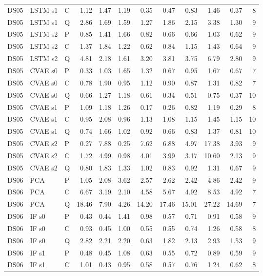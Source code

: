 \documentclass[10pt]{article}
\begin{document}
{\begin{longtable}{lllrrrrrrrrr}
DS05 & LSTM s1 & C & 1.12 & 1.47 & 1.19 & 0.35 & 0.47 & 0.83 & 1.46 & 0.37 & 8 \\
DS05 & LSTM s1 & Q & 2.86 & 1.69 & 1.59 & 1.27 & 1.86 & 2.15 & 3.38 & 1.30 & 9 \\
DS05 & LSTM s2 & P & 0.85 & 1.41 & 1.66 & 0.82 & 0.66 & 0.66 & 1.03 & 0.62 & 9 \\
DS05 & LSTM s2 & C & 1.37 & 1.84 & 1.22 & 0.62 & 0.84 & 1.15 & 1.43 & 0.64 & 9 \\
DS05 & LSTM s2 & Q & 4.81 & 2.18 & 1.61 & 3.20 & 3.81 & 3.75 & 6.79 & 2.80 & 9 \\
DS05 & CVAE s0 & P & 0.33 & 1.03 & 1.65 & 1.32 & 0.67 & 0.95 & 1.67 & 0.67 & 7 \\
DS05 & CVAE s0 & C & 0.78 & 1.90 & 0.95 & 1.12 & 0.90 & 0.87 & 1.31 & 0.82 & 7 \\
DS05 & CVAE s0 & Q & 0.66 & 1.27 & 1.18 & 0.61 & 0.34 & 0.51 & 0.75 & 0.37 & 10 \\
DS05 & CVAE s1 & P & 1.09 & 1.18 & 1.26 & 0.17 & 0.26 & 0.82 & 1.19 & 0.29 & 8 \\
DS05 & CVAE s1 & C & 0.95 & 2.08 & 0.96 & 1.13 & 1.08 & 1.15 & 1.45 & 1.15 & 10 \\
DS05 & CVAE s1 & Q & 0.74 & 1.66 & 1.02 & 0.92 & 0.66 & 0.83 & 1.37 & 0.81 & 10 \\
DS05 & CVAE s2 & P & 0.27 & 7.88 & 0.25 & 7.62 & 6.88 & 4.97 & 17.38 & 3.93 & 9 \\
DS05 & CVAE s2 & C & 1.72 & 4.99 & 0.98 & 4.01 & 3.99 & 3.17 & 10.60 & 2.13 & 9 \\
DS05 & CVAE s2 & Q & 0.80 & 1.83 & 1.33 & 1.02 & 0.83 & 0.92 & 1.31 & 0.67 & 9 \\
\midrule
DS06 & PCA & P & 1.05 & 2.08 & 3.62 & 2.57 & 2.62 & 2.42 & 4.86 & 2.42 & 9 \\
DS06 & PCA & C & 6.67 & 3.19 & 2.10 & 4.58 & 5.67 & 4.92 & 8.53 & 4.92 & 7 \\
DS06 & PCA & Q & 18.46 & 7.90 & 4.26 & 14.20 & 17.46 & 15.01 & 27.22 & 14.69 & 7 \\
DS06 & IF s0 & P & 0.43 & 0.44 & 1.41 & 0.98 & 0.57 & 0.71 & 0.91 & 0.58 & 9 \\
DS06 & IF s0 & C & 0.93 & 0.45 & 1.00 & 0.55 & 0.55 & 0.74 & 1.26 & 0.58 & 8 \\
DS06 & IF s0 & Q & 2.82 & 2.21 & 2.20 & 0.63 & 1.82 & 2.13 & 2.93 & 1.53 & 9 \\
DS06 & IF s1 & P & 0.48 & 0.45 & 1.08 & 0.63 & 0.55 & 0.72 & 0.89 & 0.59 & 9 \\
DS06 & IF s1 & C & 1.01 & 0.43 & 0.95 & 0.58 & 0.57 & 0.76 & 1.24 & 0.62 & 8 \\

\end{longtable}}
\end{document}
